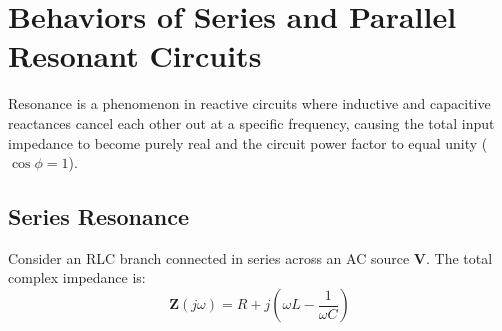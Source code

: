 \documentclass[12pt,a4paper]{article}
\begin{document}
\section{Behaviors of Series and Parallel Resonant Circuits}

Resonance is a phenomenon in reactive circuits where inductive and capacitive reactances cancel each other out at a specific frequency, causing the total input impedance to become purely real and the circuit power factor to equal unity ($\cos\phi = 1$).

\subsection{Series Resonance}

Consider an RLC branch connected in series across an AC source $\mathbf{V}$. The total complex impedance is:
\begin{equation}
  \mathbf{Z}(j\omega) = R + j\left(\omega L - \frac{1}{\omega C}\right)
\end{equation}
\end{document}
